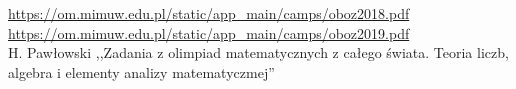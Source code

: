 
 \url{https://om.mimuw.edu.pl/static/app_main/camps/oboz2018.pdf} \\
 \url{https://om.mimuw.edu.pl/static/app_main/camps/oboz2019.pdf} \\
 H. Pawłowski ,,Zadania z olimpiad matematycznych z całego świata. Teoria liczb, algebra i elementy analizy matematyczmej'' \\